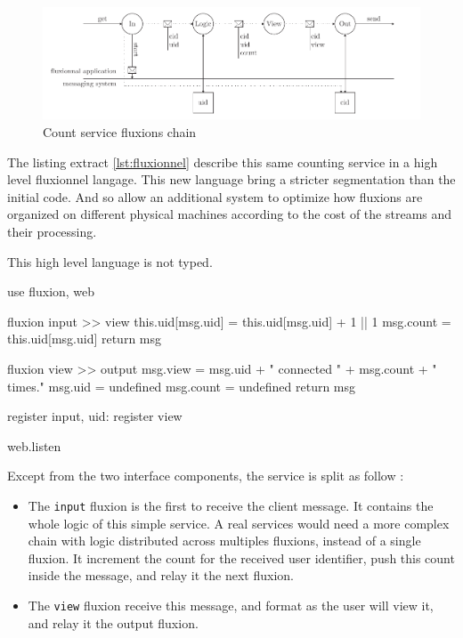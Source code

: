 \begin{figure}[h!]
  \includegraphics[width=\linewidth]{flux.pdf}
  \caption{Count service fluxions chain}
  \label{fig:fluxions}
\end{figure}

The listing extract \ref{lst:fluxionnel} describe this same counting service in a high level fluxionnel langage.
This new language bring a stricter segmentation than the initial code.
And so allow an additional system to optimize how fluxions are organized on different physical machines according to the cost of the streams and their processing. 

This high level language is not typed.

\begin{code}[Javascript, caption={Fluxionnal high level language},label={lst:fluxionnel}]
use fluxion, web

fluxion input >> view
  this.uid[msg.uid] = this.uid[msg.uid] + 1 || 1
  msg.count = this.uid[msg.uid]
  return msg

fluxion view >> output
  msg.view = msg.uid + " connected " + msg.count + " times."
  msg.uid = undefined
  msg.count = undefined
  return msg

register input, {uid: {}}
register view

web.listen
\end{code}

Except from the two interface components, the service is split as follow :
\begin{itemize}
  \item The \texttt{input} fluxion is the first to receive the client message.
  It contains the whole logic of this simple service.
  A real services would need a more complex chain with logic distributed across multiples fluxions, instead of a single fluxion.
  It increment the count for the received user identifier, push this count inside the message, and relay it the next fluxion.
  \item The \texttt{view} fluxion receive this message, and format as the user will view it, and relay it the output fluxion.
\end{itemize}